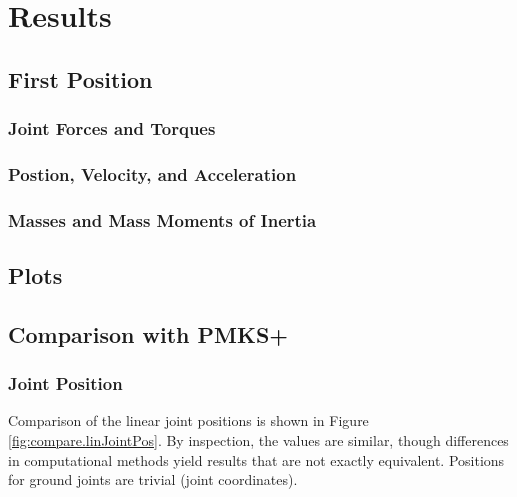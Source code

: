 \documentclass[12pt]{article}
\begin{document}
\section{Results}%
\label{res}

\subsection{First Position}%
\label{res.first}

\subsubsection{Joint Forces and Torques}%
\label{res.first.joints}

\subsubsection{Postion, Velocity, and Acceleration}%
\label{res.first.kin}

\subsubsection{Masses and Mass Moments of Inertia}%
\label{res.first.mass-mmi}

\subsection{Plots}%
\label{res.plots}

\subsection{Comparison with PMKS+}%
\label{res.compare}

\subsubsection{Joint Position}%
\label{res.compare.linJointPos}

Comparison of the linear joint positions is shown in Figure \ref{fig:compare.linJointPos}. By inspection, the values are similar, though differences in computational methods yield results that are not exactly equivalent. Positions for ground joints are trivial (joint coordinates).
\end{document}
